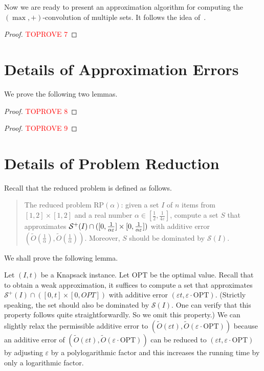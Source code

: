 \documentclass[a4paper,UKenglish,cleveref, autoref, thm-restate, pdfa]{lipics-v2021}
\newcommand{\eps}{\varepsilon}
\begin{document}
Now we are ready to present an approximation algorithm for computing the $(\max,+)$-convolution of multiple sets. It follows the idea of~\cite[Lemma 2(i)]{Chan18}.
\begin{proof}\textcolor{red}{TOPROVE 7}\end{proof}


\section{Details of Approximation Errors}\label{app:err}
We prove the following two lemmas.
\lemapproxerra*
\begin{proof}\textcolor{red}{TOPROVE 8}\end{proof}

\lemapproxerrb*
\begin{proof}\textcolor{red}{TOPROVE 9}\end{proof}

\section{Details of Problem Reduction}\label{app:reducing}
Recall that the reduced problem is defined as follows.
\begin{quote}
The reduced problem $\mathrm{RP}(\alpha)$: given a set $I$ of $n$ items from $[1,2] \times [1,2]$ and a real number $\alpha \in [\frac{1}{2}, \frac{1}{4\eps}]$, compute a set $S$ that approximates ${\cal S}^+(I) \cap ([0,\frac{1}{\alpha\eps}] \times [0, \frac{1}{\alpha\eps}])$ with additive error $(\tilde{O}(\frac{1}{\alpha}), \tilde{O}(\frac{1}{\alpha}))$. Moreover, $S$ should be dominated by $\mathcal{S}(I)$.
\end{quote}

We shall prove the following lemma.
\lemreduce*

Let $(I, t)$ be a Knapsack instance. Let $\mathrm{OPT}$ be the optimal value. Recall that to obtain a weak approximation, it suffices to compute a set that approximates $\mathcal{S}^+(I) \cap ([0, t] \times [0, OPT])$ with additive error $(\eps t, \eps\cdot \mathrm{OPT})$. (Strictly speaking, the set should also be dominated by $\mathcal{S}(I)$. One can verify that this property follows quite straightforwardly. So we omit this property.) We can slightly relax the permissible additive error to $(\tilde{O}(\eps t), \tilde{O}(\eps\cdot \mathrm{OPT}))$ because an additive error of $(\tilde{O}(\eps t), \tilde{O}(\eps\cdot \mathrm{OPT}))$ can be reduced to $(\eps t, \eps\cdot \mathrm{OPT})$ by adjusting $\eps$ by a polylogarithmic factor and this increases the running time by only a logarithmic factor.
\end{document}
